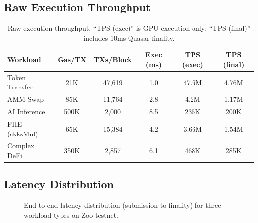 \documentclass[11pt,letterpaper]{article}
\begin{document}
\subsection{Raw Execution Throughput}

\begin{table}[t]
\centering
\begin{tabular}{lccccc}
\toprule
\textbf{Workload} & \textbf{Gas/TX} & \textbf{TXs/Block} & \textbf{Exec (ms)} & \textbf{TPS (exec)} & \textbf{TPS (final)} \\
\midrule
Token Transfer & 21K & 47,619 & 1.0 & 47.6M & 4.76M \\
AMM Swap & 85K & 11,764 & 2.8 & 4.2M & 1.17M \\
AI Inference & 500K & 2,000 & 8.5 & 235K & 200K \\
FHE (ckksMul) & 65K & 15,384 & 4.2 & 3.66M & 1.54M \\
Complex DeFi & 350K & 2,857 & 6.1 & 468K & 285K \\
\bottomrule
\end{tabular}
\caption{Raw execution throughput. ``TPS (exec)'' is GPU execution only; ``TPS (final)'' includes 10ms Quasar finality.}
\label{tab:throughput}
\end{table}

\subsection{Latency Distribution}

\begin{figure}[t]
\centering
{}
\caption{End-to-end latency distribution (submission to finality) for three workload types on Zoo testnet.}
\label{fig:latency}
\end{figure}
\end{document}
